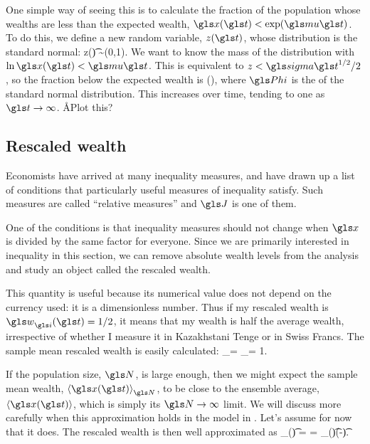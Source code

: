 One simple way of seeing this is to calculate the fraction of the population whose wealths are less than the expected wealth, \ie $\x(\t)<\exp(\gmu \t)$. To do this, we define a new random variable, $z(\t)$, whose distribution is the standard normal:
\be
z(\t) \equiv {} \sim \mathcal{\N}(0,1).
\ee
We want to know the mass of the distribution with $\ln \x(\t)<\gmu \t$. This is equivalent to $z<\gsigma \t^{1/2}/2$, so the fraction below the expected wealth is
\be
\gPhi\left(\right),
\ee
where $\gPhi$ is the \CDF of the standard normal distribution. This increases over time, tending to one as $\t\to\infty$. \AA{Plot this?}


\subsection{Rescaled wealth}
Economists have arrived at many inequality measures, and have drawn up a list of conditions that particularly useful measures of inequality satisfy. Such measures are called ``relative measures'' \cite[Appendix 4]{Sen1997} and $\J$ is one of them.

One of the conditions is that inequality measures should not change when $\x$ is divided by the same factor for everyone. Since we are primarily interested in inequality in this section, we can remove absolute wealth levels from the analysis and study an object called the rescaled wealth.


This quantity is useful because its numerical value does not 
depend on the currency used: it is a dimensionless number. 
Thus if my rescaled wealth is $\gw_\gi(\t) = 1/2$, it means that my wealth is half the 
average wealth, irrespective of whether I measure it in Kazakhstani Tenge 
or in Swiss Francs. The sample mean rescaled wealth is easily calculated:
\be
\ave{\gw_\gi(\t)}_\N = \ave{\frac{\x(\t)}{\ave{\x(\t)}_\N}}_\N = 1.
\ee

If the population size, $\N$, is large enough, then we might expect the sample mean wealth, $\ave{\x(\t)}_\N$, to be close to the ensemble average, $\ave{\x(\t)}$, which is simply its $\N\to\infty$ limit. We will discuss more carefully when this approximation holds in the \GBM model in . Let's assume for now that it does. The rescaled wealth is then well approximated as
\be
\gw_\gi(\t) = \frac{\x_\gi(\t)}{\ave{\x(\t)}} = \x_\gi(\t)\exp(-\gmu \t).
\ee

